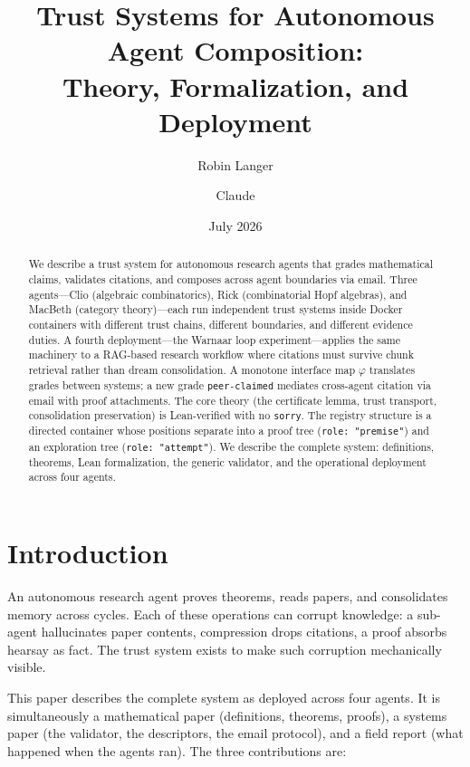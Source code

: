 \documentclass[11pt,a4paper]{article}
\title{Trust Systems for Autonomous Agent Composition:\\
\large Theory, Formalization, and Deployment}
\author{Robin Langer \and Claude}
\date{July 2026}
\newcommand{\level}[1]{\texttt{#1}}
\newcommand{\field}[1]{\texttt{#1}}
\theoremstyle{plain}
\theoremstyle{definition}
\begin{document}
\maketitle

\begin{abstract}
We describe a trust system for autonomous research agents that grades
mathematical claims, validates citations, and composes across agent
boundaries via email. Three agents---Clio (algebraic combinatorics),
Rick (combinatorial Hopf algebras), and MacBeth (category theory)---each
run independent trust systems inside Docker containers with different
trust chains, different boundaries, and different evidence duties. A
fourth deployment---the Warnaar loop experiment---applies the same
machinery to a RAG-based research workflow where citations must survive
chunk retrieval rather than dream consolidation. A
monotone interface map $\varphi$ translates grades between systems;
a new grade \level{peer-claimed} mediates cross-agent citation via
email with proof attachments. The core theory (the certificate lemma,
trust transport, consolidation preservation) is Lean-verified with no
\texttt{sorry}. The registry structure is a directed container whose
positions separate into a proof tree (\field{role: "premise"}) and an
exploration tree (\field{role: "attempt"}). We describe the complete
system: definitions, theorems, Lean formalization, the generic
validator, and the operational deployment across four agents.
\end{abstract}

\tableofcontents

\section{Introduction}

An autonomous research agent proves theorems, reads papers, and
consolidates memory across cycles. Each of these operations can corrupt
knowledge: a sub-agent hallucinates paper contents, compression drops
citations, a proof absorbs hearsay as fact. The trust system exists to
make such corruption mechanically visible.

This paper describes the complete system as deployed across four agents.
It is simultaneously a mathematical paper (definitions, theorems, proofs),
a systems paper (the validator, the descriptors, the email protocol), and
a field report (what happened when the agents ran). The three contributions
are:
\end{document}

